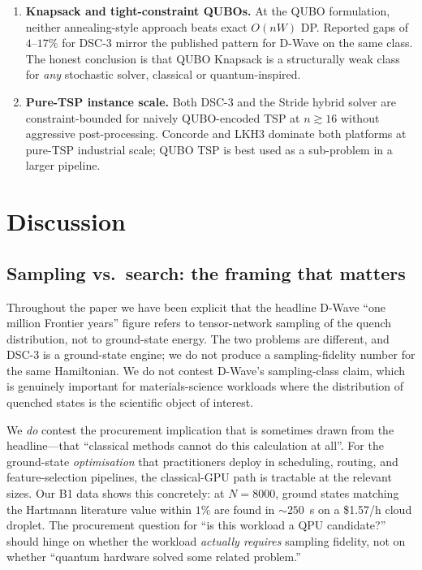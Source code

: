 \documentclass[11pt,a4paper]{article}
\begin{document}
\begin{enumerate}\itemsep0.2em
\item[\textbf{D1.}] \textbf{Knapsack and tight-constraint QUBOs.}
  At the QUBO formulation, neither annealing-style approach beats
  exact $O(nW)$ DP. Reported gaps of $4$--$17\%$ for DSC-3 mirror the
  published pattern for D-Wave on the same class. The honest
  conclusion is that QUBO Knapsack is a structurally weak class for
  \emph{any} stochastic solver, classical or quantum-inspired.
\item[\textbf{D2.}] \textbf{Pure-TSP instance scale.} Both DSC-3
  and the Stride hybrid solver are constraint-bounded for naively
  QUBO-encoded TSP at $n\!\gtrsim\!16$ without aggressive
  post-processing. Concorde and LKH3 dominate both platforms at
  pure-TSP industrial scale; QUBO TSP is best used as a sub-problem
  in a larger pipeline.
\end{enumerate}

\section{Discussion}
\label{sec:discussion}

\subsection{Sampling vs.\ search: the framing that matters}

Throughout the paper we have been explicit that the headline D-Wave
``one million Frontier years'' figure refers to tensor-network sampling
of the quench distribution, not to ground-state energy. The two problems
are different, and DSC-3 is a ground-state engine; we do not produce a
sampling-fidelity number for the same Hamiltonian. We do not contest
D-Wave's sampling-class claim, which is genuinely important for
materials-science workloads where the distribution of quenched states
is the scientific object of interest.

We \emph{do} contest the procurement implication that is sometimes drawn
from the headline---that ``classical methods cannot do this calculation
at all''. For the ground-state \emph{optimisation} that practitioners
deploy in scheduling, routing, and feature-selection pipelines, the
classical-GPU path is tractable at the relevant sizes. Our B1 data shows
this concretely: at $N\!=\!8000$, ground states matching the Hartmann
literature value within $1\%$ are found in $\sim 250$~s on a \$1.57/h
cloud droplet. The procurement question for ``is this workload a QPU
candidate?'' should hinge on whether the workload \emph{actually
requires} sampling fidelity, not on whether ``quantum hardware solved
some related problem.''
\end{document}

